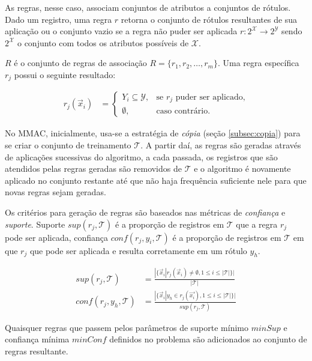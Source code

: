 \documentclass[runningheads,a4paper]{llncs}
\begin{document}
As regras, nesse caso, associam conjuntos de atributos a conjuntos de rótulos.
Dado um registro, uma regra $r$ retorna o conjunto de rótulos resultantes de sua aplicação ou o conjunto vazio se a regra não puder ser aplicada $r : 2^\mathcal{X} \to 2^\mathcal{Y}$ sendo $2^\mathcal{X}$ o conjunto com todos os atributos possíveis de $\mathcal{X}$. 

$R$ é o conjunto de regras de associação $R = \{ r_1, r_2, \dots, r_m \}$. Uma regra específica $r_j$ possui o seguinte resultado:

\begin{align*}
	r_j(\vec{x}_i) &= \begin{cases}
						 Y_i \subseteq \mathcal{Y}, & \text{se $r_j$ puder ser aplicado,} \\
			             \emptyset, & \text{caso contrário.}
		            \end{cases}
\end{align*}

No MMAC, inicialmente, usa-se a estratégia de \textit{cópia} (seção \ref{subsec:copia}) para se criar o conjunto de treinamento $\mathcal{T}$. A partir daí, as regras são geradas através de aplicações sucessivas do algoritmo, a cada passada, os registros que são atendidos pelas regras geradas são removidos de $\mathcal{T}$ e o algoritmo é novamente aplicado no conjunto restante até que não haja frequência suficiente nele para que novas regras sejam geradas.

Os critérios para geração de regras são baseados nas métricas de \textit{confiança} e \textit{suporte}. Suporte $sup(r_j, \mathcal{T})$ é a proporção de registros em $\mathcal{T}$ que a regra $r_j$ pode ser aplicada, confiança $conf(r_j, y_i, \mathcal{T})$ é a proporção de registros em $\mathcal{T}$ em que $r_j$ que pode ser aplicada e resulta corretamente em um rótulo $y_h$.

\begin{align*}
	sup(r_j, \mathcal{T}) &= \frac{|\{ \vec{x}_i | r_j(\vec{x}_i) \neq \emptyset, 1 \leq i \leq |\mathcal{T}| \}|}{|\mathcal{T}|} \\
	conf(r_j, y_h, \mathcal{T}) &= \frac{|\{ \vec{x}_i | y_h \in r_j(\vec{x_i}), 1 \leq i \leq |\mathcal{T}| \}|}{sup(r_j, \mathcal{T})} 
\end{align*}

Quaisquer regras que passem pelos parâmetros de suporte mínimo $minSup$ e confiança mínima $minConf$ definidos no problema são adicionados ao conjunto de regras resultante.
\end{document}
